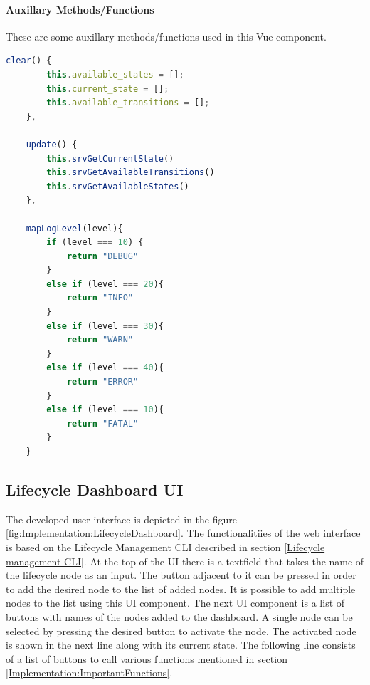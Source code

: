 \paragraph{Auxillary Methods/Functions} These are some auxillary methods/functions used in this Vue component.
\label{Implementation:Auxillary functions}
\begin{lstlisting}[language=JavaScript,
	caption={Auxillary functions}, 
	label={code:Auxillary functions}]
	clear() {
		this.available_states = [];
		this.current_state = [];
		this.available_transitions = [];
	},

	update() {
		this.srvGetCurrentState()
		this.srvGetAvailableTransitions()
		this.srvGetAvailableStates()
	},

	mapLogLevel(level){
		if (level === 10) {
			return "DEBUG"
		} 
		else if (level === 20){
			return "INFO"
		}
		else if (level === 30){
			return "WARN"
		}
		else if (level === 40){
			return "ERROR"
		}
		else if (level === 10){
			return "FATAL"
		}
	}
\end{lstlisting}
		

\subsection{Lifecycle Dashboard UI}
The developed user interface is depicted in the figure \ref{fig:Implementation:LifecycleDashboard}. 
The functionalitiies of the web interface is based on the Lifecycle Management CLI described in section \ref{Lifecycle management CLI}. At the top of the UI there is a textfield that takes the name of the lifecycle node as an input. The button adjacent to it can be pressed in order to add the desired node to the list of added nodes. It is possible to add multiple nodes to the list using this UI component.
The next UI component is a list of buttons with names of the nodes added to the dashboard. A single node can be selected by pressing the desired button to activate the node. The activated node is shown in the next line along with its current state. The following line consists of a list of buttons to call various functions mentioned in section \ref*{Implementation:ImportantFunctions}.

